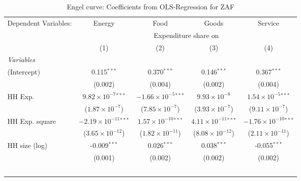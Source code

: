 
\begin{table}[htbp!]
   \centering
   \small
   \begin{adjustbox}{width = 1\textwidth, max height = 0.95\textheight, center}
      \begin{threeparttable}[b]
         \caption{\label{tab:Engel_parametric_ZAF} Engel curve: Coefficients from OLS-Regression for ZAF}
         \begin{tabular}{lcccc}
            \tabularnewline \midrule \midrule
            Dependent Variables: & Energy                          & Food                           & Goods                          & Service\\  
             & \multicolumn{4}{c}{Expenditure share on} \\ 
                                 & (1)                             & (2)                            & (3)                            & (4)\\  
            \midrule
            \emph{Variables}\\
            (Intercept)          & 0.115$^{***}$                   & 0.370$^{***}$                  & 0.146$^{***}$                  & 0.367$^{***}$\\   
                                 & (0.002)                         & (0.004)                        & (0.002)                        & (0.004)\\   
            HH Exp.              & $9.82\times 10^{-7}$$^{***}$    & $-1.66\times 10^{-5}$$^{***}$  & $9.93\times 10^{-8}$           & $1.54\times 10^{-5}$$^{***}$\\    
                                 & ($1.87\times 10^{-7}$)          & ($7.85\times 10^{-7}$)         & ($3.93\times 10^{-7}$)         & ($9.11\times 10^{-7}$)\\    
            HH Exp. square       & $-2.19\times 10^{-11}$$^{***}$  & $1.57\times 10^{-10}$$^{***}$  & $4.11\times 10^{-11}$$^{***}$  & $-1.76\times 10^{-10}$$^{***}$\\    
                                 & ($3.65\times 10^{-12}$)         & ($1.82\times 10^{-11}$)        & ($8.08\times 10^{-12}$)        & ($2.11\times 10^{-11}$)\\    
            HH size (log)        & -0.009$^{***}$                  & 0.026$^{***}$                  & 0.038$^{***}$                  & -0.055$^{***}$\\   
                                 & (0.001)                         & (0.002)                        & (0.002)                        & (0.002)\\   
$$
\end{tabular}
\end{threeparttable}
\end{adjustbox}
\end{table}
